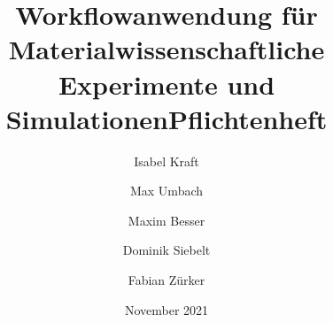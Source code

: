 \documentclass[paper=a4, fontsize = 12pt, DIV = calc, twoside=off, parskip=full, numbers=noenddot]{scrbook}
\title{Workflowanwendung für Materialwissenschaftliche Experimente und Simulationen}
\title {Pflichtenheft}
\author{Isabel Kraft \and Max Umbach 
        \and Maxim Besser \and Dominik Siebelt \and Fabian Zürker}
\date{November 2021}
\begin{document}
\maketitle

\newpage
\tableofcontents
\newpage













\printnoidxglossaries
\end{document}
